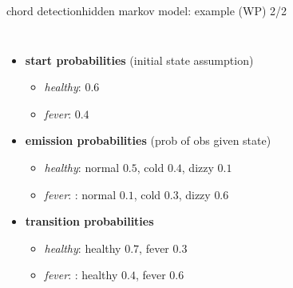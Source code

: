         \begin{frame}{chord detection}{hidden markov model: example (WP) 2/2}
            \begin{columns}[T]
            \begin{itemize}
                \item   \textbf{start probabilities} (initial state assumption)
                    \begin{itemize}
                        \item   \textit{healthy}: $ 0.6$
                        \item   \textit{fever}: $0.4$
                    \end{itemize}
                \item<2->   \textbf{emission probabilities} (prob of obs given state)
                    \begin{itemize}
                        \item   \textit{healthy}: normal $0.5$, cold $0.4$, dizzy $0.1$
                        \item   \textit{fever}: : normal $0.1$, cold $0.3$, dizzy $0.6$
                    \end{itemize}
                \item<3->   \textbf{transition probabilities}
                    \begin{itemize}
                        \item   \textit{healthy}: healthy $0.7$, fever $0.3$
                        \item   \textit{fever}: : healthy $0.4$, fever $0.6$
                    \end{itemize}
            \end{itemize}
            \end{columns}
        \end{frame}
